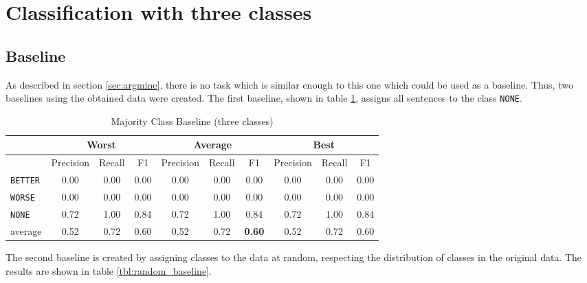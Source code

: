 
\section{Classification with three classes}
\subsection{Baseline}
As described in section \ref{sec:argmine}, there is no task which is similar enough to this one which could be used as a baseline. Thus, two baselines using the obtained data were created. The first baseline, shown in table \ref{tbl:majority_class_baseline}, assigns all sentences to the class \texttt{NONE}.



    \begin{table}[h]
\centering
\caption{ Majority Class Baseline (three classes)}
\label{tbl:majority_class_baseline}
\begin{tabular}{@{}lccccccccc@{}}
\toprule
      & \multicolumn{3}{c}{Worst} & \multicolumn{3}{c}{Average} & \multicolumn{3}{c}{Best}  \\ \midrule
                 & Precision  & Recall & F1   & Precision  & Recall  & F1    & Precision & Recall & F1   \\ \toprule

    
\texttt{BETTER}	 & 0.00	 & 0.00	 & 0.00	 &0.00	 & 0.00	 & 0.00	 &0.00	 & 0.00	 & 0.00	 \\ 
\texttt{WORSE}	 & 0.00	 & 0.00	 & 0.00	 &0.00	 & 0.00	 & 0.00	 &0.00	 & 0.00	 & 0.00	 \\ 
\texttt{NONE}	 & 0.72	 & 1.00	 & 0.84	 &0.72	 & 1.00	 & 0.84	 &0.72	 & 1.00	 & 0.84	 \\ \midrule 
average	 & 0.52	 & 0.72	 & 0.60	 &0.52	 & 0.72	 & \textbf{0.60}	 &0.52	 & 0.72	 & 0.60	 \\ \bottomrule

    \end{tabular}
\end{table}

The second baseline is created by assigning classes to the data at random, respecting the distribution of classes in the original data. The results are shown in table \ref{tbl:random_baseline}.

